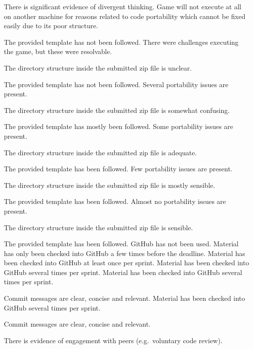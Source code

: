 \documentclass{../fal_assignment}
\begin{document}
\begin{markingrubric}
            \par There is significant evidence of divergent thinking.
%
        \grade\fail Game will not execute at all on another machine for reasons related to code portability which cannot be fixed easily due to its poor structure.
            \par The provided template has not been followed.
        \grade There were challenges executing the game, but these were resolvable.
            \par The directory structure inside the submitted zip file is unclear.
            \par The provided template has not been followed.
        \grade Several portability issues are present.
            \par The directory structure inside the submitted zip file is somewhat confusing.
            \par The provided template has mostly been followed.
        \grade Some portability issues are present.
            \par The directory structure inside the submitted zip file is adequate.
            \par The provided template has been followed.
        \grade Few portability issues are present.
            \par The directory structure inside the submitted zip file is mostly sensible.
            \par The provided template has been followed.
        \grade Almost no portability issues are present.
            \par The directory structure inside the submitted zip file is sensible.
            \par The provided template has been followed.
%
        \grade\fail GitHub has not been used.
        \grade Material has only been checked into GitHub a few times before the deadline.
        \grade Material has been checked into GitHub at least once per sprint.
        \grade Material has been checked into GitHub several times per sprint.
        \grade Material has been checked into GitHub several times per sprint.
            \par Commit messages are clear, concise and relevant.
        \grade Material has been checked into GitHub several times per sprint.
            \par Commit messages are clear, concise and relevant.
            \par There is evidence of engagement with peers (e.g.\ voluntary code review).
\end{markingrubric}
\end{document}
